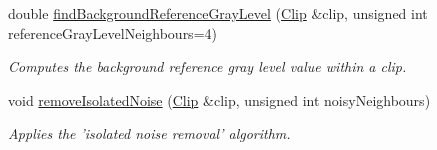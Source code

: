 \begin{CompactItemize}
double \hyperlink{class_preprocessor_95613606bb7882b2ac821dae5f8327b9}{findBackgroundReferenceGrayLevel} (\hyperlink{class_clip}{Clip} \&clip, unsigned int referenceGrayLevelNeighbours=4)
\begin{CompactList}\small\item\em Computes the background reference gray level value within a clip. \item\end{CompactList}\item 
void \hyperlink{class_preprocessor_491c0dd6b38f870e22425d0e66ebc788}{removeIsolatedNoise} (\hyperlink{class_clip}{Clip} \&clip, unsigned int noisyNeighbours)
\begin{CompactList}\small\item\em Applies the 'isolated noise removal' algorithm. \item\end{CompactList}\end{CompactItemize}
